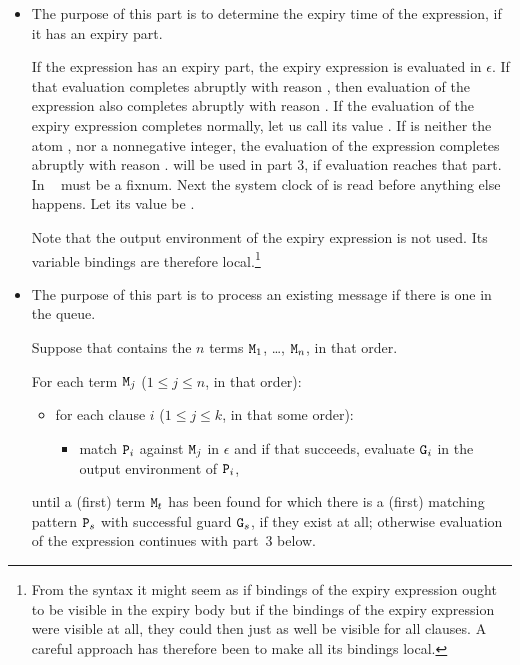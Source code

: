 \begin{itemize}
\item {}
The purpose of this part is to determine the expiry time of the
 expression, if it has an expiry part.

If the  expression has an expiry part, the expiry
expression  is evaluated in $\epsilon$.  If that evaluation
completes abruptly with reason , then evaluation of the
 expression also completes abruptly with reason .  If
the evaluation of the expiry expression completes normally, let us
call its value .  If  is neither the
atom , nor a nonnegative integer, the evaluation of the
 expression completes abruptly with reason .
 will be used in part 3, if evaluation reaches that part.
\ifOld In \OldErlang\  must be a fixnum. \fi
Next the system clock of  is read before anything else
happens.  Let its value be .

Note that the output environment of the expiry expression is not used.
Its variable bindings are therefore local.\footnote{From the syntax it
might seem as if bindings of the expiry expression ought to be visible
in the expiry body but if the bindings of the expiry expression were
visible at all, they could then just as well be visible for all
clauses.  A careful approach has therefore been to make all its
bindings local.}

\item {}
The purpose of this part is to process an existing message if there
is one in the queue.

Suppose that  contains
the $n$ terms ${\tt{\sl M}}_1$, \ldots, ${\tt{\sl M}}_n$, in that order.
\begin{textdisplay}
For each term ${\tt{\sl M}}_j$ ($1\leq j\leq n$, in that order):
\begin{itemize}
\item[] for each clause $i$ ($1\leq j\leq k$, in \ifStd that \fi \ifOld some \fi order):
\begin{itemize}
\item[] match ${\tt{\sl P}}_i$ against ${\tt{\sl M}}_j$ in $\epsilon$ and if that
succeeds, evaluate ${\tt{\sl G}}_i$ in the output environment of ${\tt{\sl P}}_i$,
\end{itemize}
\end{itemize}
\end{textdisplay}
until a (first) term ${\tt{\sl M}}_t$ has been found for which there is a
\ifStd (first) \fi matching pattern ${\tt{\sl P}}_s$ with successful guard ${\tt{\sl G}}_s$,
if they exist at all; otherwise evaluation of the
 expression continues with part~3 below.


\end{itemize}
